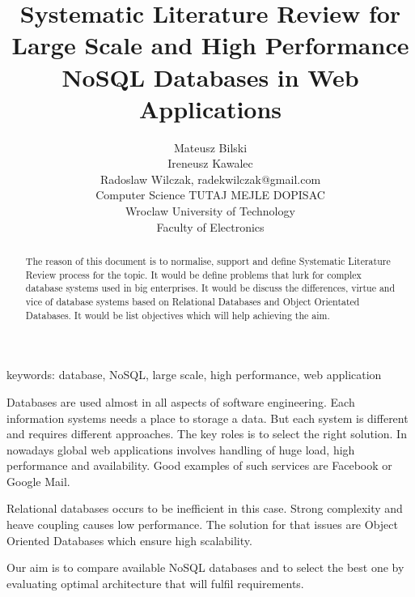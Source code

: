 \documentclass[times, 10pt,twocolumn]{article}
\begin{document}
\title{ Systematic Literature Review
       for Large Scale and High Performance NoSQL Databases in Web Applications}

\author{Mateusz Bilski\\ Ireneusz Kawalec \\ Radoslaw Wilczak, radekwilczak@gmail.com\\ Computer Science TUTAJ MEJLE DOPISAC \\
Wroclaw University of Technology\\ Faculty of Electronics \\ 
}

\maketitle
\thispagestyle{empty}

\begin{abstract}  

The reason of this document is to normalise, support and define Systematic Literature Review process for the topic.
It would be define problems that lurk for complex database systems used in big enterprises. 
It would be discuss the differences, virtue and vice of database systems based on Relational Databases and Object Orientated Databases.
It would be list objectives which will help achieving the aim.

\end{abstract} 

keywords: database, NoSQL, large scale, high performance, web application


Databases are used almost in all aspects of software engineering. Each 
information systems needs a place to storage a data. But each system is different
and requires different approaches. The key roles is to select the right solution.
In nowadays global web applications involves handling of huge load, high performance and
availability. Good examples of such services are Facebook or Google Mail.

Relational databases occurs to be inefficient in this case. Strong complexity and
heave coupling causes low performance. The solution for that issues are Object Oriented
Databases which ensure high scalability.

Our aim is to compare available NoSQL databases and to select the best one by evaluating 
optimal architecture that will fulfil requirements. 
\end{document}
